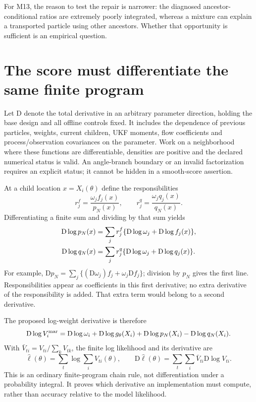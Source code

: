 \documentclass[11pt]{article}
\newcommand{\D}{\mathrm D}
\begin{document}
For M13, the reason to test the repair is narrower: the diagnosed
ancestor-conditional ratios are extremely poorly integrated, whereas
a mixture can explain a transported particle using other ancestors.
Whether that opportunity is sufficient is an empirical question.

\section{The score must differentiate the same finite program}

Let $\D$ denote the total derivative in an arbitrary parameter direction,
holding the base design and all offline controls fixed. It includes the
dependence of previous particles, weights, current children, UKF moments,
flow coefficients and process/observation covariances on the parameter.
Work on a neighborhood where these functions are differentiable, densities
are positive and the declared numerical status is valid. An angle-branch
boundary or an invalid factorization requires an explicit status; it cannot
be hidden in a smooth-score assertion.

At a child location $x=X_i(\theta)$ define the responsibilities
\[
 r_j^f=\frac{\omega_j f_j(x)}{p_N(x)},\qquad
 r_j^q=\frac{\omega_j q_j(x)}{q_N(x)}.
\]
Differentiating a finite sum and dividing by that sum yields
\begin{align}
 \D\log p_N(x)
   &=\sum_j r_j^f\{\D\log\omega_j+\D\log f_j(x)\},\notag\\
 \D\log q_N(x)
   &=\sum_j r_j^q\{\D\log\omega_j+\D\log q_j(x)\}.
 \label{eq:mixture-score}
\end{align}
For example,
$\D p_N=\sum_j\{(\D\omega_j)f_j+\omega_j\D f_j\}$;
division by $p_N$ gives the first line. Responsibilities appear as
coefficients in this first derivative; no extra derivative of the
responsibility is added. That extra term would belong to a second derivative.

The proposed log-weight derivative is therefore
\begin{equation}
 \D\log V_i^{\rm mar}
 =\D\log\omega_i+\D\log g_\theta(X_i)
       +\D\log p_N(X_i)-\D\log q_N(X_i).
 \label{eq:weight-score}
\end{equation}
With $\bar V_{ti}=V_{ti}/\sum_k V_{tk}$, the finite log likelihood
and its derivative are
\begin{equation}
 \widehat\ell(\theta)=\sum_t\log\!\sum_i V_{ti}(\theta),\qquad
 \D\widehat\ell(\theta)=
             \sum_t\sum_i\bar V_{ti}\D\log V_{ti}.
 \label{eq:finite-score}
\end{equation}
This is an ordinary finite-program chain rule, not differentiation under
a probability integral. It proves which derivative an implementation must
compute, rather than accuracy relative to the model likelihood.
\end{document}
